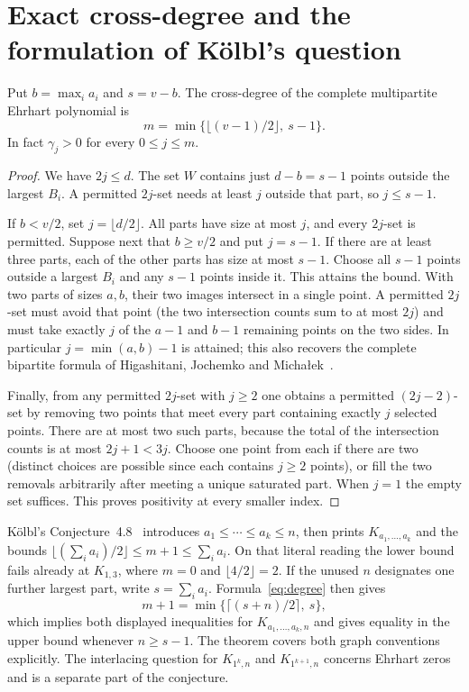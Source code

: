 \section{Exact cross-degree and the formulation of K\"olbl's question}
\label{sec:cross-degree}

\begin{theorem}\label{thm:crossdegree}
Put $b=\max_i a_i$ and $s=v-b$. The cross-degree of the complete
multipartite Ehrhart polynomial is
\begin{equation}\label{eq:degree}
 m=\min\{\lfloor(v-1)/2\rfloor,\ s-1\}.
\end{equation}
In fact $\gamma_j>0$ for every $0\le j\le m$.
\end{theorem}

\begin{proof}
We have $2j\le d$. The set $W$ contains just $d-b=s-1$ points outside
the largest $B_i$. A permitted $2j$-set needs at least $j$ outside that
part, so $j\le s-1$.

If $b<v/2$, set $j=\lfloor d/2\rfloor$. All parts have size at most $j$,
and every $2j$-set is permitted. Suppose next that $b\ge v/2$ and put
$j=s-1$. If there are at least three parts, each of the other parts has
size at most $s-1$. Choose all $s-1$ points outside a largest $B_i$ and
any $s-1$ points inside it. This attains the bound. With two parts of
sizes $a,b$, their two images intersect in a single point. A permitted
$2j$-set must avoid that point (the two intersection counts sum to at most
$2j$) and must take exactly $j$ of the $a-1$ and $b-1$ remaining points
on the two sides. In particular $j=\min(a,b)-1$ is attained; this also
recovers the complete bipartite formula of Higashitani, Jochemko and
Micha\l ek~\cite[Thm.~4.1]{hjm}.

Finally, from any permitted $2j$-set with $j\ge2$ one obtains a
permitted $(2j-2)$-set by removing two points that meet every part
containing exactly $j$ selected points. There are at most two such parts,
because the total of the intersection counts is at most $2j+1<3j$.
Choose one point from each if there are two (distinct choices are
possible since each contains $j\ge2$ points), or fill the two removals
arbitrarily after meeting a unique saturated part. When $j=1$ the empty
set suffices. This proves positivity at every smaller index.
\end{proof}

K\"olbl's Conjecture~4.8~\cite{kolbl} introduces
$a_1\le\cdots\le a_k\le n$, then prints $K_{a_1,\ldots,a_k}$ and the
bounds $\lfloor(\sum_i a_i)/2\rfloor\le m+1\le\sum_i a_i$.
On that literal reading the lower bound fails already at $K_{1,3}$,
where $m=0$ and $\lfloor4/2\rfloor=2$. If the unused $n$ designates
one further largest part, write $s=\sum_i a_i$. Formula~\eqref{eq:degree}
then gives
\[
  m+1=\min\{\lceil(s+n)/2\rceil,\ s\},
\]
which implies both displayed inequalities for $K_{a_1,\ldots,a_k,n}$ and
gives equality in the upper bound whenever $n\ge s-1$. The theorem
covers both graph conventions explicitly. The interlacing question for
$K_{1^k,n}$ and $K_{1^{k+1},n}$ concerns Ehrhart zeros and is a separate
part of the conjecture.
